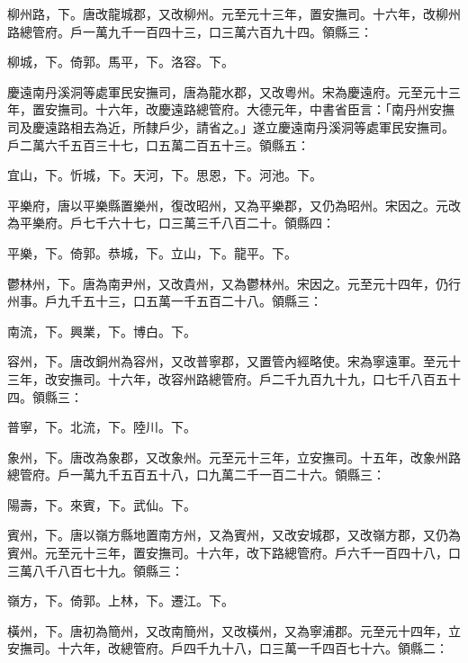 \begin{pinyinscope}
 柳州路，下。唐改龍城郡，又改柳州。元至元十三年，置安撫司。十六年，改柳州路總管府。戶一萬九千一百四十三，口三萬六百九十四。領縣三：



 柳城，下。倚郭。馬平，下。洛容。下。



 慶遠南丹溪洞等處軍民安撫司，唐為龍水郡，又改粵州。宋為慶遠府。元至元十三年，置安撫司。十六年，改慶遠路總管府。大德元年，中書省臣言：「南丹州安撫司及慶遠路相去為近，所隸戶少，請省之。」遂立慶遠南丹溪洞等處軍民安撫司。戶二萬六千五百三十七，口五萬二百五十三。領縣五：



 宜山，下。忻城，下。天河，下。思恩，下。河池。下。



 平樂府，唐以平樂縣置樂州，復改昭州，又為平樂郡，又仍為昭州。宋因之。元改為平樂府。戶七千六十七，口三萬三千八百二十。領縣四：



 平樂，下。倚郭。恭城，下。立山，下。龍平。下。



 鬱林州，下。唐為南尹州，又改貴州，又為鬱林州。宋因之。元至元十四年，仍行州事。戶九千五十三，口五萬一千五百二十八。領縣三：



 南流，下。興業，下。博白。下。



 容州，下。唐改銅州為容州，又改普寧郡，又置管內經略使。宋為寧遠軍。至元十三年，改安撫司。十六年，改容州路總管府。戶二千九百九十九，口七千八百五十四。領縣三：



 普寧，下。北流，下。陸川。下。



 象州，下。唐改為象郡，又改象州。元至元十三年，立安撫司。十五年，改象州路總管府。戶一萬九千五百五十八，口九萬二千一百二十六。領縣三：



 陽壽，下。來賓，下。武仙。下。



 賓州，下。唐以嶺方縣地置南方州，又為賓州，又改安城郡，又改嶺方郡，又仍為賓州。元至元十三年，置安撫司。十六年，改下路總管府。戶六千一百四十八，口三萬八千八百七十九。領縣三：



 嶺方，下。倚郭。上林，下。遷江。下。



 橫州，下。唐初為簡州，又改南簡州，又改橫州，又為寧浦郡。元至元十四年，立安撫司。十六年，改總管府。戶四千九十八，口三萬一千四百七十六。領縣二：




\end{pinyinscope}
